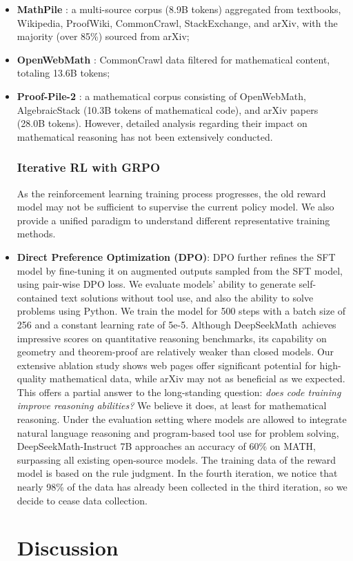 \begin{itemize}[topsep=0pt]
\begin{itemize}[topsep=0pt]
    \item \textbf{MathPile} \citep{mathpile}: a multi-source corpus (8.9B tokens) aggregated from textbooks, Wikipedia, ProofWiki, CommonCrawl, StackExchange, and arXiv, with the majority (over 85\%) sourced from arXiv;
    \item \textbf{OpenWebMath} \citep{openwebmath}: CommonCrawl data filtered for mathematical content, totaling 13.6B tokens;
    \item \textbf{Proof-Pile-2} \citep{llemma}: a mathematical corpus consisting of OpenWebMath, AlgebraicStack (10.3B tokens of mathematical code), and arXiv papers (28.0B tokens). However, detailed analysis regarding their impact on mathematical reasoning has not been extensively conducted. \subsubsection{Iterative RL with GRPO} As the reinforcement learning training process progresses, the old reward model may not be sufficient to supervise the current policy model. We also provide a unified paradigm to understand different representative training methods. \item \textbf{Direct Preference Optimization (DPO)}: DPO further refines the SFT model by fine-tuning it on augmented outputs sampled from the SFT model, using pair-wise DPO loss. We evaluate models' ability to generate self-contained text solutions without tool use, and also the ability to solve problems using Python. We train the model for 500 steps with a batch size of 256 and a constant learning rate of 5e-5. Although DeepSeekMath~achieves impressive scores on quantitative reasoning benchmarks, its capability on geometry and theorem-proof are relatively weaker than closed models. Our extensive ablation study shows web pages offer significant potential for high-quality mathematical data, while arXiv may not as beneficial as we expected. This offers a partial answer to the long-standing question: \textit{does code training improve reasoning abilities?} We believe it does, at least for mathematical reasoning. Under the evaluation setting where models are allowed to integrate natural language reasoning and program-based tool use for problem solving, DeepSeekMath-Instruct 7B approaches an accuracy of 60\% on MATH, surpassing all existing open-source models. The training data of the reward model is based on the rule judgment. In the fourth iteration, we notice that nearly 98\% of the data has already been collected in the third iteration, so we decide to cease data collection. \section{Discussion}

\end{itemize}
\end{itemize}
